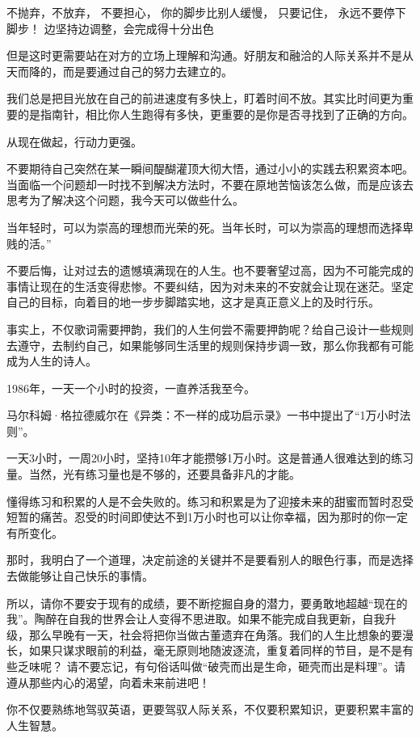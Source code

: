 \documentclass[UTF8,a4paper,8pt]{ctexart}
\begin{document}
 
 不抛弃，不放弃， 不要担心， 你的脚步比别人缓慢， 只要记住， 永远不要停下脚步！ 边坚持边调整，会完成得十分出色
 
 
 但是这时更需要站在对方的立场上理解和沟通。好朋友和融洽的人际关系并不是从天而降的，而是要通过自己的努力去建立的。
 
 
 我们总是把目光放在自己的前进速度有多快上，盯着时间不放。其实比时间更为重要的是指南针，相比你人生跑得有多快，更重要的是你是否寻找到了正确的方向。
 
 
 从现在做起，行动力更强。
 
 
 不要期待自己突然在某一瞬间醍醐灌顶大彻大悟，通过小小的实践去积累资本吧。当面临一个问题却一时找不到解决方法时，不要在原地苦恼该怎么做，而是应该去思考为了解决这个问题，我今天可以做些什么。
 
 
 当年轻时，可以为崇高的理想而光荣的死。当年长时，可以为崇高的理想而选择卑贱的活。”
 
 
 不要后悔，让对过去的遗憾填满现在的人生。也不要奢望过高，因为不可能完成的事情让现在的生活变得悲惨。不要纠结，因为对未来的不安就会让现在迷茫。坚定自己的目标，向着目的地一步步脚踏实地，这才是真正意义上的及时行乐。
 
 
 事实上，不仅歌词需要押韵，我们的人生何尝不需要押韵呢？给自己设计一些规则去遵守，去制约自己，如果能够同生活里的规则保持步调一致，那么你我都有可能成为人生的诗人。
 
 
 1986年，一天一个小时的投资，一直养活我至今。
 
 
 马尔科姆·格拉德威尔在《异类：不一样的成功启示录》一书中提出了“1万小时法则”。
 
 
 一天3小时，一周20小时，坚持10年才能攒够1万小时。这是普通人很难达到的练习量。当然，光有练习量也是不够的，还要具备非凡的才能。
 
 
 懂得练习和积累的人是不会失败的。练习和积累是为了迎接未来的甜蜜而暂时忍受短暂的痛苦。忍受的时间即使达不到1万小时也可以让你幸福，因为那时的你一定有所变化。
 
 
 那时，我明白了一个道理，决定前途的关键并不是要看别人的眼色行事，而是选择去做能够让自己快乐的事情。
 
 
 所以，请你不要安于现有的成绩，要不断挖掘自身的潜力，要勇敢地超越“现在的我”。陶醉在自我的世界会让人变得不思进取。如果不能完成自我更新，自我升级，那么早晚有一天，社会将把你当做古董遗弃在角落。我们的人生比想象的要漫长，如果只谋求眼前的利益，毫无原则地随波逐流，重复着同样的节目，是不是有些乏味呢？ 请不要忘记，有句俗话叫做“破壳而出是生命，砸壳而出是料理”。请遵从那些内心的渴望，向着未来前进吧！
 
 
 你不仅要熟练地驾驭英语，更要驾驭人际关系，不仅要积累知识，更要积累丰富的人生智慧。
 
\end{document}
